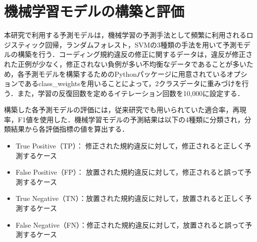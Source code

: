 \documentclass[11pt,dvipdfmx]{jreport}
\begin{document}
\section{機械学習モデルの構築と評価}

本研究で利用する予測モデルは，機械学習の予測手法として頻繁に利用されるロジスティック回帰，ランダムフォレスト，SVMの3種類の手法を用いて予測モデルの構築を行う．コーディング規約違反の修正に関するデータは，違反が修正された正例が少なく，修正されない負例が多い不均衡なデータであることが多いため，各予測モデルを構築するためのPythonパッケージに用意されているオプションであるclass\_weightsを用いることによって，2クラスデータに重みづけを行う．また，学習の反復回数を定めるイテレーション回数を10,000に設定する．

構築した各予測モデルの評価には，従来研究でも用いられていた適合率，再現率，F1値を使用した．機械学習モデルの予測結果は以下の4種類に分類され，分類結果から各評価指標の値を算出する．



\begin{itemize}
\item True Positive（TP）： 修正された規約違反に対して，修正されると正しく予測するケース
\item False Positive（FP）： 放置された規約違反に対して，修正されると誤って予測するケース
\item True Negative（TN）：放置された規約違反に対して，放置されると正しく予測するケース
\item False Negative（FN）：修正された規約違反に対して，放置されると誤って予測するケース
\end{itemize}
\end{document}
